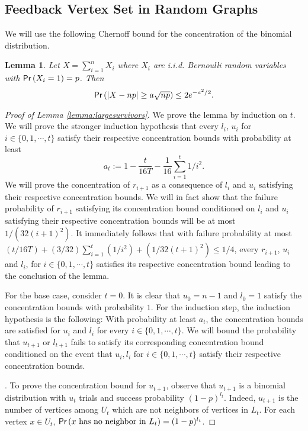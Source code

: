 \documentclass[11pt]{article}
\newtheorem{lemma}[theorem]{Lemma}
\newcommand{\prob}[1]{{\sf Pr}\left(#1\right)}
\begin{document}
\subsection{Feedback Vertex Set in Random Graphs}
We will use the following Chernoff bound for the concentration of the binomial distribution.
\begin{lemma} \label{lemma:chernoff}
Let $X=\sum_{i=1}^n X_i$ where $X_i$ are i.i.d. Bernoulli random variables with $\prob{X_i=1}=p$. Then
\[
\prob{|X-np|\geq a\sqrt{np}}\leq 2e^{-a^2/2}.
\]
\end{lemma}

\begin{proof}[Proof of Lemma \ref{lemma:largesurvivors}]
We prove the lemma by induction on $t$. We will prove the stronger induction hypothesis that every $l_i$, $u_i$ for $i\in\{0,1,\cdots,t\}$ satisfy their respective concentration bounds with probability at least
\[
a_t:= 1-\frac{t}{16T} -\frac{1}{16}\sum_{i=1}^{t}1/i^2.
\]
We will prove the concentration of $r_{i+1}$ as a consequence of $l_i$ and $u_i$ satisfying their respective concentration bounds. We will in fact show that the failure probability of $r_{i+1}$ satisfying its concentration bound conditioned on $l_i$ and $u_i$ satisfying their respective concentration bounds will be at most $1/(32(i+1)^2)$. It immediately follows that with failure probability at most $(t/16T)+(3/32)\sum_{i=1}^{t}(1/i^2)+(1/32(t+1)^2)\leq 1/4$, every $r_{i+1}$, $u_i$ and $l_i$, for $i\in\{0,1,\cdots,t\}$ satisfies its respective concentration bound leading to the conclusion of the lemma.

For the base case, consider $t=0$. It is clear that $u_0=n-1$ and $l_0=1$ satisfy the concentration bounds with probability $1$. For the induction step, the induction hypothesis is the following: With probability at least $a_t$, the concentration bounds are satisfied for $u_i$ and $l_i$ for every $i\in \{0,1,\cdots,t\}$. We will bound the probability that $u_{t+1}$ or $l_{t+1}$ fails to satisfy its corresponding concentration bound conditioned on the event that $u_i,l_i$ for $i\in\{0,1,\cdots,t\}$ satisfy their respective concentration bounds.

. To prove the concentration bound for $u_{t+1}$, observe that $u_{t+1}$ is a binomial distribution with $u_t$ trials and success probability $(1-p)^{l_t}$. Indeed, $u_{t+1}$ is the number of vertices among $U_t$ which are not neighbors of vertices in $L_t$. For each vertex $x\in U_t$, $\prob{\text{$x$ has no neighbor in $L_t$}}=(1-p)^{l_t}$.


\end{proof}
\end{document}
